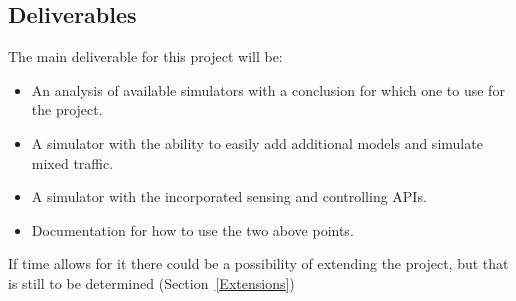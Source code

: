 \subsection{Deliverables}
The main deliverable for this project will be:
\begin{itemize}
    \item An analysis of available simulators with a conclusion for which one to use for the project.
    \item A simulator with the ability to easily add additional models and simulate mixed traffic.
    \item A simulator with the incorporated sensing and controlling APIs.
    \item Documentation for how to use the two above points.
\end{itemize}
If time allows for it there could be a possibility of extending the project, but that is still to be determined (Section~\ref{Extensions}) 
